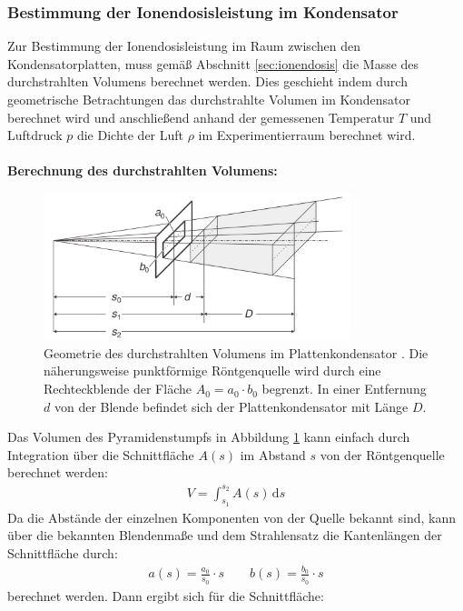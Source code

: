 \documentclass[11pt, a4paper]{article}
\numberwithin{equation}{section}
\begin{document}
\subsubsection{Bestimmung der Ionendosisleistung im Kondensator}
Zur Bestimmung der Ionendosisleistung im Raum zwischen den Kondensatorplatten, muss gemäß Abschnitt \ref{sec:ionendosis} die Masse des durchstrahlten Volumens berechnet werden.
Dies geschieht indem durch geometrische Betrachtungen das durchstrahlte Volumen im Kondensator berechnet wird und anschließend anhand der gemessenen Temperatur $T$ und Luftdruck $p$ die Dichte der Luft $\rho$ im Experimentierraum berechnet wird.\\
\\
\textbf{Berechnung des durchstrahlten Volumens:}\\
\begin{figure}[h]
	\centering
	\includegraphics[width=0.8\textwidth]{./figures/volumen_kondensator.png}
	\caption{Geometrie des durchstrahlten Volumens im Plattenkondensator \cite{ld_didactic}. Die näherungsweise punktförmige Röntgenquelle wird durch eine Rechteckblende der Fläche $A_0 = a_0 \cdot b_0$ begrenzt. In einer Entfernung $d$ von der Blende befindet sich der Plattenkondensator mit Länge $D$.}
	\label{fig:kondensator_volumen}
\end{figure}
Das Volumen des Pyramidenstumpfs in Abbildung \ref{fig:kondensator_volumen} kann einfach durch Integration über die Schnittfläche $A(s)$ im Abstand $s$ von der Röntgenquelle berechnet werden:
\begin{align}
	V = \int_{s_1}^{s_2} A(s) \, \mathrm{d}s
\end{align}
Da die Abstände der einzelnen Komponenten von der Quelle bekannt sind, kann über die bekannten Blendenmaße und dem Strahlensatz die Kantenlängen der Schnittfläche durch:
\begin{align}
	a(s) = \frac{a_0}{s_0} \cdot s \qquad b(s) = \frac{b_0}{s_0} \cdot s
\end{align}
berechnet werden.
Dann ergibt sich für die Schnittfläche:
\end{document}
